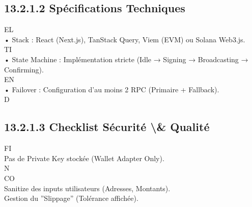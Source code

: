 \documentclass[12pt,landscape,a4paper]{article}
\begin{document}
\subsection{13.2.1.2 Spécifications Techniques}
\vspace{0.5em}
\vspace{0.5em}
\vspace{0.5em}
\vspace{0.5em}
EL\\
• Stack : React (Next.js), TanStack Query, Viem (EVM) ou Solana Web3.js.\\
\vspace{0.5em}
\vspace{0.5em}
\vspace{0.5em}
\vspace{0.5em}
TI\\
• State Machine : Implémentation stricte (Idle → Signing → Broadcasting → Confirming).\\
\vspace{0.5em}
\vspace{0.5em}
\vspace{0.5em}
\vspace{0.5em}
EN\\
• Failover : Configuration d’au moins 2 RPC (Primaire + Fallback).\\
\vspace{0.5em}
\vspace{0.5em}
\vspace{0.5em}
\vspace{0.5em}
D\\
\subsection{13.2.1.3 Checklist Sécurité \textbackslash{}& Qualité}
\vspace{0.5em}
\vspace{0.5em}
\vspace{0.5em}
\vspace{0.5em}
FI\\
Pas de Private Key stockée (Wallet Adapter Only).\\
N\\
CO\\
Sanitize des inputs utilisateurs (Adresses, Montants).\\
\vspace{0.5em}
Gestion du ”Slippage” (Tolérance affichée).\\
\vspace{0.5em}
\end{document}
